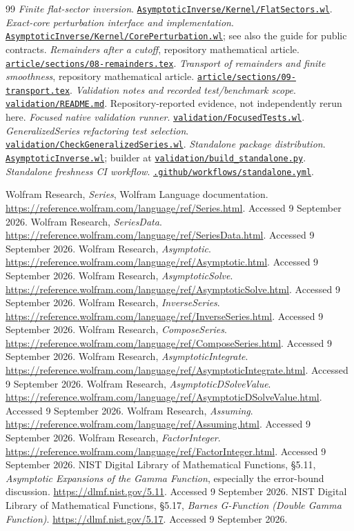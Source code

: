 \documentclass[11pt,a4paper]{article}
\newcommand{\repourl}[1]{\href{https://github.com/VladimirReshetnikov/Asymptotic/blob/07a9781212beb2eeb9ff16aa625b50ac27974078/#1}{\nolinkurl{#1}}}
\theoremstyle{definition}
\begin{document}
\begin{thebibliography}{99}
 \emph{Finite flat-sector inversion}. \repourl{AsymptoticInverse/Kernel/FlatSectors.wl}.
 \emph{Exact-core perturbation interface and implementation}. \repourl{AsymptoticInverse/Kernel/CorePerturbation.wl}; see also the guide for public contracts.
 \emph{Remainders after a cutoff}, repository mathematical article. \repourl{article/sections/08-remainders.tex}.
 \emph{Transport of remainders and finite smoothness}, repository mathematical article. \repourl{article/sections/09-transport.tex}.
 \emph{Validation notes and recorded test/benchmark scope}. \repourl{validation/README.md}. Repository-reported evidence, not independently rerun here.
 \emph{Focused native validation runner}. \repourl{validation/FocusedTests.wl}.
 \emph{GeneralizedSeries refactoring test selection}. \repourl{validation/CheckGeneralizedSeries.wl}.
 \emph{Standalone package distribution}. \repourl{AsymptoticInverse.wl}; builder at \repourl{validation/build_standalone.py}.
 \emph{Standalone freshness CI workflow}. \repourl{.github/workflows/standalone.yml}.

 Wolfram Research, \emph{Series}, Wolfram Language documentation. \url{https://reference.wolfram.com/language/ref/Series.html}. Accessed 9 September 2026.
 Wolfram Research, \emph{SeriesData}. \url{https://reference.wolfram.com/language/ref/SeriesData.html}. Accessed 9 September 2026.
 Wolfram Research, \emph{Asymptotic}. \url{https://reference.wolfram.com/language/ref/Asymptotic.html}. Accessed 9 September 2026.
 Wolfram Research, \emph{AsymptoticSolve}. \url{https://reference.wolfram.com/language/ref/AsymptoticSolve.html}. Accessed 9 September 2026.
 Wolfram Research, \emph{InverseSeries}. \url{https://reference.wolfram.com/language/ref/InverseSeries.html}. Accessed 9 September 2026.
 Wolfram Research, \emph{ComposeSeries}. \url{https://reference.wolfram.com/language/ref/ComposeSeries.html}. Accessed 9 September 2026.
 Wolfram Research, \emph{AsymptoticIntegrate}. \url{https://reference.wolfram.com/language/ref/AsymptoticIntegrate.html}. Accessed 9 September 2026.
 Wolfram Research, \emph{AsymptoticDSolveValue}. \url{https://reference.wolfram.com/language/ref/AsymptoticDSolveValue.html}. Accessed 9 September 2026.
 Wolfram Research, \emph{Assuming}. \url{https://reference.wolfram.com/language/ref/Assuming.html}. Accessed 9 September 2026.
 Wolfram Research, \emph{FactorInteger}. \url{https://reference.wolfram.com/language/ref/FactorInteger.html}. Accessed 9 September 2026.
 NIST Digital Library of Mathematical Functions, \S5.11, \emph{Asymptotic Expansions of the Gamma Function}, especially the error-bound discussion. \url{https://dlmf.nist.gov/5.11}. Accessed 9 September 2026.
 NIST Digital Library of Mathematical Functions, \S5.17, \emph{Barnes G-Function (Double Gamma Function)}. \url{https://dlmf.nist.gov/5.17}. Accessed 9 September 2026.
\end{thebibliography}
\end{document}

